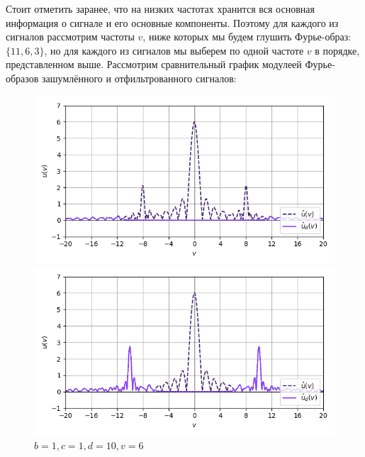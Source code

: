 \documentclass[a4paper]{article}
\begin{document}
Стоит отметить заранее, что на низких частотах хранится вся основная информация о сигнале и его основные компоненты. Поэтому для каждого из сигналов рассмотрим частоты $v$, ниже которых мы будем глушить Фурье-образ: $\{11, 6, 3\}$, но для каждого из сигналов мы выберем по одной частоте $v$ в порядке, представленном выше. Рассмотрим сравнительный график модулеей Фурье-образов зашумлённого и отфильтрованного сигналов:
\begin{figure}[H]
    \begin{minipage}{0.33\textwidth}
        \centering \includegraphics[width=\textwidth]{sources/high-pass filter/fourier (b=0, c=0.8, d=8, v=11).png}
        \caption{$b = 0, c = 0.8, d = 8, v = 11$}
    \end{minipage}\hfill
    \begin{minipage}{0.33\textwidth}
        \centering \includegraphics[width=\textwidth]{sources/high-pass filter/fourier (b=1, c=1, d=10, v=6).png}
        \caption{$b = 1, c = 1, d = 10, v = 6$}
    \end{minipage}\hfill
    \begin{minipage}{0.33\textwidth}

\end{minipage}
\end{figure}
\end{document}
